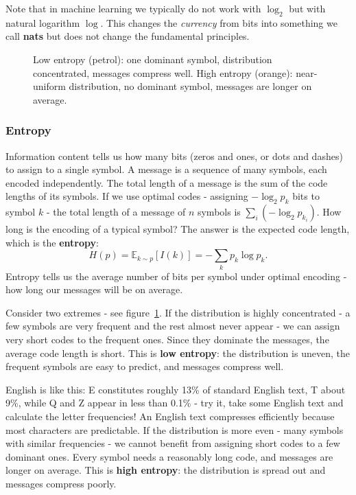 Note that in machine learning we typically do not work with $\log_2$ but with natural logarithm $\log$. This changes the \emph{currency} from bits into something we call \textbf{nats} but does not change the fundamental principles. 

\begin{figure}
\centering
{}
\resizebox{0.36\textwidth}{!}{}
\caption{Low entropy (petrol): one dominant symbol, distribution concentrated, messages compress well. High entropy (orange): near-uniform distribution, no dominant symbol, messages are longer on average.}
\label{fig:entropy_distributions}
\end{figure}

\subsubsection{Entropy}

Information content tells us how many bits (zeros and ones, or dots and dashes) to assign to a single symbol. A message is a sequence of many symbols, each encoded independently. The total length of a message is the sum of the code lengths of its symbols. If we use optimal codes - assigning $-\log_2 p_k$ bits to symbol $k$ - the total length of a message of $n$ symbols is $\sum_i (-\log_2 p_{k_i})$. How long is the encoding of a typical symbol? The answer is the expected code length, which is the \textbf{entropy}:
\begin{equation}
    H(p) = \mathbb{E}_{k \sim p}[I(k)] = -\sum_k p_k \log p_k.
\end{equation}
Entropy tells us the average number of bits per symbol under optimal encoding - how long our messages will be on average.



Consider two extremes - see figure~\ref{fig:entropy_distributions}. If the distribution is highly concentrated - a few symbols are very frequent and the rest almost never appear - we can assign very short codes to the frequent ones. Since they dominate the messages, the average code length is short. This is \textbf{low entropy}: the distribution is uneven, the frequent symbols are easy to predict, and messages compress well.

English is like this: E constitutes roughly 13\% of standard English text, T about 9\%, while Q and Z appear in less than 0.1\% - try it, take some English text and calculate the letter frequencies! An English text compresses efficiently because most characters are predictable. If the distribution is more even - many symbols with similar frequencies - we cannot benefit from assigning short codes to a few dominant ones. Every symbol needs a reasonably long code, and messages are longer on average. This is \textbf{high entropy}: the distribution is spread out and messages compress poorly.

